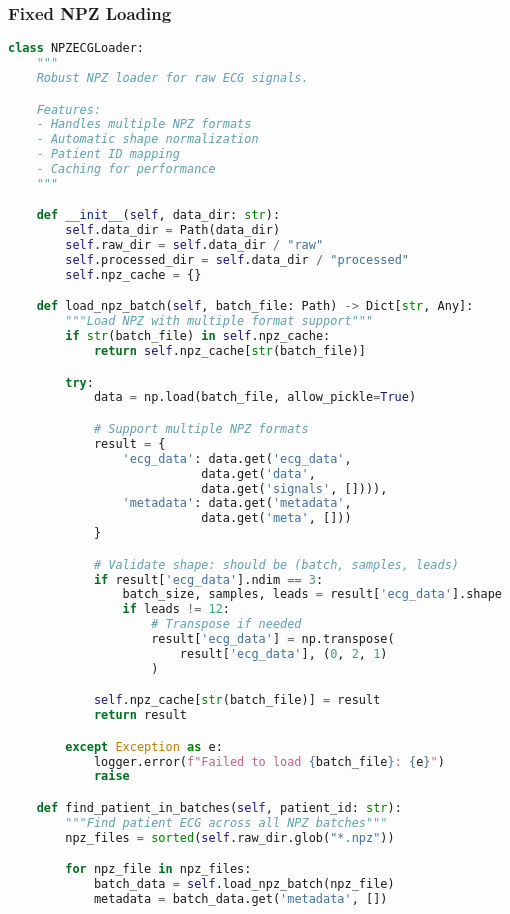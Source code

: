 \documentclass[11pt]{article}
\begin{document}
\subsubsection{Fixed NPZ Loading}

\begin{lstlisting}[language=Python, caption=NPZ Loader with Error Handling]
class NPZECGLoader:
    """
    Robust NPZ loader for raw ECG signals.

    Features:
    - Handles multiple NPZ formats
    - Automatic shape normalization
    - Patient ID mapping
    - Caching for performance
    """

    def __init__(self, data_dir: str):
        self.data_dir = Path(data_dir)
        self.raw_dir = self.data_dir / "raw"
        self.processed_dir = self.data_dir / "processed"
        self.npz_cache = {}

    def load_npz_batch(self, batch_file: Path) -> Dict[str, Any]:
        """Load NPZ with multiple format support"""
        if str(batch_file) in self.npz_cache:
            return self.npz_cache[str(batch_file)]

        try:
            data = np.load(batch_file, allow_pickle=True)

            # Support multiple NPZ formats
            result = {
                'ecg_data': data.get('ecg_data',
                           data.get('data',
                           data.get('signals', []))),
                'metadata': data.get('metadata',
                           data.get('meta', []))
            }

            # Validate shape: should be (batch, samples, leads)
            if result['ecg_data'].ndim == 3:
                batch_size, samples, leads = result['ecg_data'].shape
                if leads != 12:
                    # Transpose if needed
                    result['ecg_data'] = np.transpose(
                        result['ecg_data'], (0, 2, 1)
                    )

            self.npz_cache[str(batch_file)] = result
            return result

        except Exception as e:
            logger.error(f"Failed to load {batch_file}: {e}")
            raise

    def find_patient_in_batches(self, patient_id: str):
        """Find patient ECG across all NPZ batches"""
        npz_files = sorted(self.raw_dir.glob("*.npz"))

        for npz_file in npz_files:
            batch_data = self.load_npz_batch(npz_file)
            metadata = batch_data.get('metadata', [])


\end{lstlisting}
\end{document}

